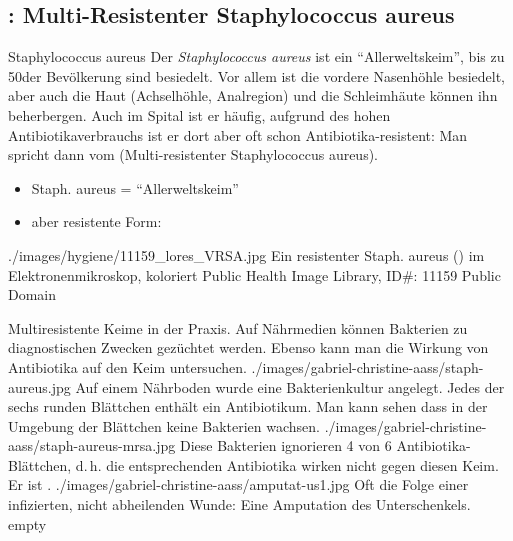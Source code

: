 \subsection{: Multi-Resistenter Staphylococcus
aureus} 



\TextSlideTeaser
{Staphylococcus aureus}%
{%
Der \emph{Staphylococcus aureus} ist ein
\enquote{Allerweltskeim}, bis zu 50\PC* der Bevölkerung sind
besiedelt. Vor allem ist die vordere Nasenhöhle besiedelt,
aber auch die Haut (Achselhöhle, Analregion) und die
Schleimhäute können ihn beherbergen. Auch im Spital ist er
häufig, aufgrund des hohen Antibiotikaverbrauchs ist er dort
aber oft schon Antibiotika-resistent: Man spricht dann vom
 (Multi-resistenter Staphylococcus aureus).}%
{
\begin{itemize}
    \item Staph. aureus = \enquote{Allerweltskeim}
    \item aber resistente Form:
\end{itemize}}%
{./images/hygiene/11159_lores_VRSA.jpg}%
{Ein
resistenter Staph. aureus () im Elektronenmikroskop,
koloriert}%
{}%
{Public Health Image Library, ID\#: 11159}%
{Public Domain}%


\begin{PictureSeriesWide}{}{Multiresistente Keime in der
Praxis. Auf Nährmedien können Bakterien zu diagnostischen
Zwecken gezüchtet werden. Ebenso kann man die Wirkung von
Antibiotika auf den Keim untersuchen.}
{./images/gabriel-christine-aass/staph-aureus.jpg}
{Auf einem Nährboden wurde eine Bakterienkultur
angelegt. Jedes der sechs runden Blättchen enthält ein Antibiotikum. Man kann
sehen dass in der Umgebung der Blättchen keine Bakterien wachsen.
}
{./images/gabriel-christine-aass/staph-aureus-mrsa.jpg}
{Diese Bakterien ignorieren 4 von 6
Antibiotika-Blättchen, d.\,h. die entsprechenden Antibiotika wirken
nicht gegen diesen Keim. Er ist .
}
{./images/gabriel-christine-aass/amputat-us1.jpg}
{Oft die Folge einer infizierten, nicht abheilenden
Wunde: Eine Amputation des Unterschenkels.
}
{empty}
{}
\end{PictureSeriesWide}



